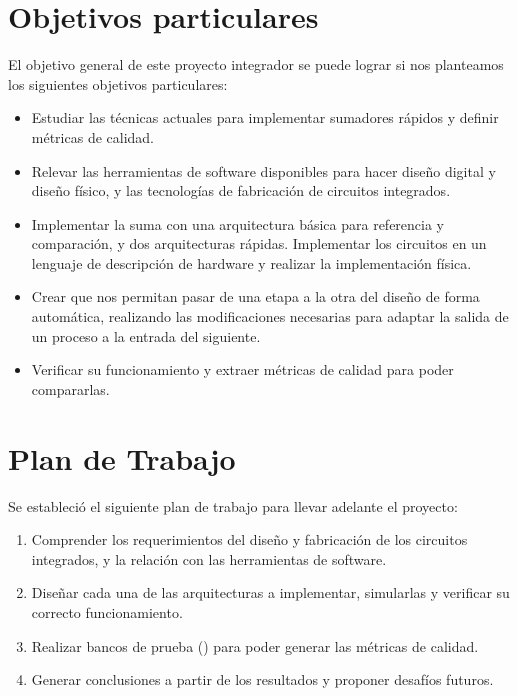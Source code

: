 \section{Objetivos particulares}
El objetivo general de este proyecto integrador se puede lograr si nos planteamos los siguientes objetivos particulares:

\begin{itemize}
\item Estudiar las técnicas actuales para implementar sumadores rápidos y definir métricas de calidad.
\item Relevar las herramientas de software disponibles para hacer diseño digital y diseño físico, y las tecnologías de fabricación de circuitos integrados.
\item Implementar la suma con una arquitectura básica para referencia y comparación, y dos arquitecturas rápidas. Implementar los circuitos en un lenguaje de descripción de hardware y realizar la implementación física.
\item Crear  que nos permitan pasar de una etapa a la otra del diseño de forma automática, realizando las modificaciones necesarias para adaptar la salida de un proceso a la entrada del siguiente.
\item Verificar su funcionamiento y extraer métricas de calidad para poder compararlas.
\end{itemize}

\section{Plan de Trabajo}
Se estableció el siguiente plan de trabajo para llevar adelante el proyecto:
\begin{enumerate}
\item Comprender los requerimientos del diseño y fabricación de los circuitos integrados, y la relación con las herramientas de software.
\item Diseñar cada una de las arquitecturas a implementar, simularlas y verificar su correcto funcionamiento. 
\item Realizar bancos de prueba () para poder generar las métricas de calidad.
\item Generar conclusiones a partir de los resultados y proponer desafíos futuros.

\end{enumerate}



